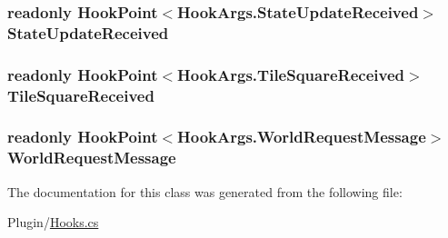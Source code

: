 \subsubsection[{State\+Update\+Received}]{\setlength{\rightskip}{0pt plus 5cm}readonly {\bf Hook\+Point}$<${\bf Hook\+Args.\+State\+Update\+Received}$>$ State\+Update\+Received\hspace{0.3cm}{\ttfamily [static]}}\label{classOTA_1_1Plugin_1_1HookPoints_a62abf7a39a0fd348b58d2546b5646f21}
\hypertarget{classOTA_1_1Plugin_1_1HookPoints_ac32c3b19a84c675b4b9f45cdc66edf41}{}
\subsubsection[{Tile\+Square\+Received}]{\setlength{\rightskip}{0pt plus 5cm}readonly {\bf Hook\+Point}$<${\bf Hook\+Args.\+Tile\+Square\+Received}$>$ Tile\+Square\+Received\hspace{0.3cm}{\ttfamily [static]}}\label{classOTA_1_1Plugin_1_1HookPoints_ac32c3b19a84c675b4b9f45cdc66edf41}
\hypertarget{classOTA_1_1Plugin_1_1HookPoints_ad7748c9d7ff039435cd147429c008e16}{}
\subsubsection[{World\+Request\+Message}]{\setlength{\rightskip}{0pt plus 5cm}readonly {\bf Hook\+Point}$<${\bf Hook\+Args.\+World\+Request\+Message}$>$ World\+Request\+Message\hspace{0.3cm}{\ttfamily [static]}}\label{classOTA_1_1Plugin_1_1HookPoints_ad7748c9d7ff039435cd147429c008e16}


The documentation for this class was generated from the following file\+:\begin{DoxyCompactItemize}
\item 
Plugin/\hyperlink{Hooks_8cs}{Hooks.\+cs}\end{DoxyCompactItemize}

